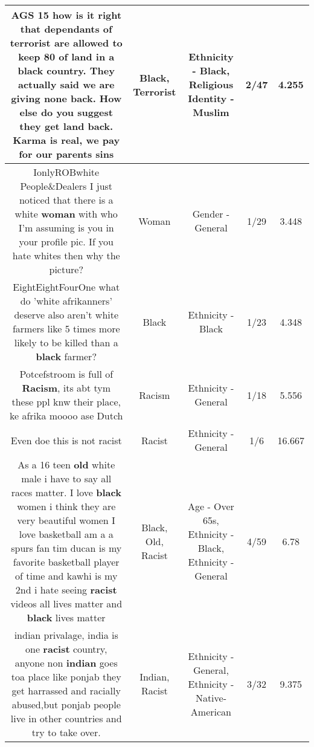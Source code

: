 \documentclass[11pt]{article}
\newlength\mylength
\begin{document}
\begin{center}
\begin{longtable}{|C{.65\mylength}|C{.30\mylength}|C{.12\mylength}|C{.12\mylength}|C{.12\mylength}|}
  \small AGS 15 how is it right that dependants of \textbf{terrorist} are allowed to keep 80 of land in a \textbf{black} country. They actually said we are giving none back. How else do you suggest they get land back. Karma is real, we pay for our parents sins\normalsize   & Black, Terrorist & Ethnicity - Black, Religious Identity - Muslim & 2/47 & 4.255 \\  \hline
  \small IonlyROBwhite People\&Dealers I just noticed that there is a white \textbf{woman} with who I'm assuming is you in your profile pic. If you hate whites then why the picture?\normalsize   & Woman & Gender - General & 1/29 & 3.448 \\  \hline
  \small    EightEightFourOne what do 'white afrikanners' deserve also aren't white farmers like 5 times more likely to be killed than a \textbf{black} farmer?\normalsize   & Black & Ethnicity - Black & 1/23 & 4.348 \\  \hline
  \small Potcefstroom is full of \textbf{Racism}, its abt tym these ppl knw their place, ke afrika moooo ase Dutch\normalsize   & Racism & Ethnicity - General & 1/18 & 5.556 \\  \hline
  \small Even doe this is not racist\normalsize   & Racist & Ethnicity - General & 1/6 & 16.667 \\  \hline
  \small As a 16 teen \textbf{old} white male i have to say all races matter. I love \textbf{black} women i think they are very beautiful women I love basketball am a a spurs fan tim ducan is my favorite basketball player of time and kawhi is my 2nd i hate seeing \textbf{racist} videos all lives matter and \textbf{black} lives matter\normalsize   & Black, Old, Racist & Age - Over 65s, Ethnicity - Black, Ethnicity - General & 4/59 & 6.78 \\  \hline
  \small indian privalage, india is one \textbf{racist} country, anyone non \textbf{indian} goes toa place like ponjab they get harrassed and racially abused,but ponjab people live in other countries and try to take over.\normalsize   & Indian, Racist & Ethnicity - General, Ethnicity - Native-American & 3/32 & 9.375 \\  \hline

\end{longtable}
\end{center}
\end{document}
